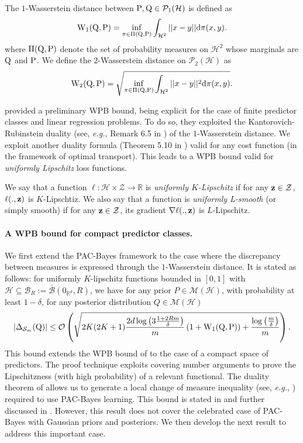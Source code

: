 \begin{definition}
\label{def: wasserstein}
The $1$-Wasserstein distance between $\P,\Q \in \mathcal{P}_1(\mathcal{H})$ is defined as
\[ \W_{1}(\Q,\P) = \inf_{\pi \in \Pi(\Q,\P)} \int_{\mathcal{H}^2} ||x-y||\mathrm{d}\pi(x,y). \]
where $\Pi(\Q,\P)$ denote the set of probability measures on $\mathcal{H}^2$ whose marginals are $\Q$ and $\P$.
We define the $2$-Wasserstein distance on $\mathcal{P}_2(\mathcal{H})$ as
\[ \W_{2}(\Q,\P) = \sqrt{\inf_{\pi \in \Pi(\Q,\P)} \int_{\mathcal{H}^2} ||x-y||^2\mathrm{d}\pi(x,y)}. \]
\end{definition}
\citet{amit2022integral} provided a preliminary WPB bound, being explicit for the case of finite predictor classes and linear regression problems. To do so, they exploited the Kantorovich-Rubinstein duality (see, \emph{e.g.}, Remark 6.5 in \citealp{villani2009optimal}) of the $1$-Wasserstein distance. We exploit another duality formula (Theorem 5.10 in \citealp{villani2009optimal}) valid for any cost function (in the framework of optimal transport). This leads to a WPB bound valid for \emph{uniformly Lipschitz} loss functions.
\begin{definition}
\label{def: unif_lpz}
We say that a function $\ell:\mathcal{H}\times\mathcal{Z}\rightarrow \mathbb{R}$ is \emph{uniformly $K$-Lipschitz} if for any $\z\in\mathcal{Z}$, $\ell(.,\z)$ is $K$-Lipschtiz. We also say that a function is \emph{uniformly L-smooth} (or simply smooth) if for any $\z\in\mathcal{Z}$, its gradient $\nabla \ell(.,\z)$ is $L$-Lipschitz.
\end{definition}

\paragraph{A WPB bound for compact predictor classes.}
We first extend the PAC-Bayes framework to the case where the discrepancy between measures is expressed through the $1$-Wasserstein distance. It is stated as follows: for uniformly $K$-lipschitz functions bounded in $[0,1]$ with  $\mathcal{H}\subseteq \mathcal{B}_R:= \bar{\mathcal{B}}(0_{\mathbb{R}^d},R)$, we have for any prior $P\in\mathcal{M}(\mathcal{H})$, with probability at least $1-\delta$, for any posterior distribution $Q\in\mathcal{M}(\mathcal{H})$
\[ |\Delta_{\Sm}(\Q)| \leq \mathcal{O}\left(\sqrt{2K(2K+1)\frac{2d\log\left(3\frac{1 +2Rm }{\delta}\right)}{m} \left(1+\W_{1}(\Q,\P)  \right) +\frac{\log\left( \frac{m}{\delta} \right)}{m} } \right). \]
This bound extends the WPB bound of \citet{amit2022integral} to the case of a compact space of predictors. The proof technique exploits covering number arguments to prove the Lipschitzness (with high probability) of a relevant functional. The duality theorem of \citet[Theorem 5.10]{villani2009optimal} allows us to generate a local change of measure inequality (see, \emph{e.g.}, \citealp{donsker1976asymp}) required to use PAC-Bayes learning.
This bound is stated in  and further discussed in . However, this result does not cover the celebrated case of PAC-Bayes with Gaussian priors and posteriors. We then develop the next result to address this important case.

